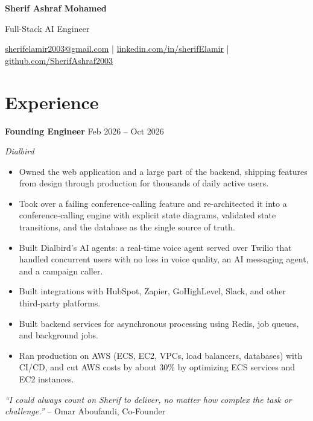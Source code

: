 \documentclass[a4paper,10pt]{article}
\newcommand{\role}[3]{\textbf{#1} \hfill #3\par\textit{#2}\par}
\begin{document}
\begin{center}
{\LARGE\textbf{Sherif Ashraf Mohamed}}\par\vspace{4pt}
{\normalsize Full-Stack AI Engineer}\par\vspace{3pt}
\small
\href{mailto:sherifelamir2003@gmail.com}{sherifelamir2003@gmail.com} | \href{https://linkedin.com/in/sherifElamir}{linkedin.com/in/sherifElamir} | \href{https://github.com/SherifAshraf2003}{github.com/SherifAshraf2003}
\end{center}

\section{Experience}
\role{Founding Engineer}{Dialbird}{Feb 2026 -- Oct 2026}
\begin{itemize}
    \item Owned the web application and a large part of the backend, shipping features from design through production for thousands of daily active users.
    \item Took over a failing conference-calling feature and re-architected it into a conference-calling engine with explicit state diagrams, validated state transitions, and the database as the single source of truth.
    \item Built Dialbird's AI agents: a real-time voice agent served over Twilio that handled concurrent users with no loss in voice quality, an AI messaging agent, and a campaign caller.
    \item Built integrations with HubSpot, Zapier, GoHighLevel, Slack, and other third-party platforms.
    \item Built backend services for asynchronous processing using Redis, job queues, and background jobs.
    \item Ran production on AWS (ECS, EC2, VPCs, load balancers, databases) with CI/CD, and cut AWS costs by about 30\% by optimizing ECS services and EC2 instances.
\end{itemize}
\textit{``I could always count on Sherif to deliver, no matter how complex the task or challenge.''} -- Omar Aboufandi, Co-Founder\par
\vspace{3pt}
\end{document}
